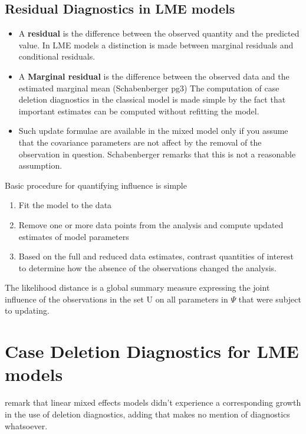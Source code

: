 \documentclass[12pt, a4paper]{article}
\begin{document}
\subsection{Residual Diagnostics in LME models}
\begin{itemize}
	\item A \textbf{residual} is the difference between the observed quantity and the predicted value. In LME models a distinction is made between marginal residuals and conditional residuals.
	
	\item A \textbf{Marginal residual} is the difference between the observed data and the estimated marginal mean (Schabenberger  pg3)
	The computation of case deletion diagnostics in the classical model is made simple by the fact that important estimates can be computed without refitting the model. 
	
	\item Such update formulae are available in the mixed model only if you assume that the covariance parameters are not affect by the removal of the observation in question. Schabenberger remarks that this is not a reasonable assumption.
	
\end{itemize}


Basic procedure for quantifying influence is simple

\begin{enumerate}
	\item  	Fit the model to the data
	\item   	Remove one or more data points from the analysis and compute updated estimates of model parameters
	\item  	Based on the full and reduced data estimates, contrast quantities of interest to determine how the absence of the observations changed the analysis.
\end{enumerate}
The likelihood distance is a global summary measure expressing the joint influence of the observations in the set U on all parameters in $\Psi$ that were subject to updating.


\section{Case Deletion Diagnostics for LME models}

\citet{HaslettDillane} remark that linear mixed effects models
didn't experience a corresponding growth in the use of deletion
diagnostics, adding that \citet{McCullSearle} makes no mention of
diagnostics whatsoever.
\end{document}
